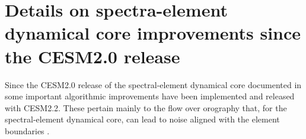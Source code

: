 \documentclass[draft]{agujournal2019}
\begin{document}
%
%



%
%
%
%
\appendix
\section{Details on spectra-element dynamical core improvements since the CESM2.0 release}\label{sec:a1}
Since the CESM2.0 release of the spectral-element dynamical core documented in  some important algorithmic improvements have been implemented and released with CESM2.2. These pertain mainly to the flow over orography that, for the spectral-element dynamical core, can lead to noise aligned with the element boundaries \cite{HL2018MWR}.
\end{document}
